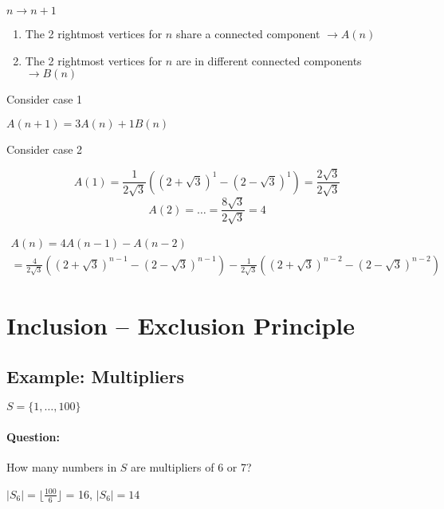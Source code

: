\documentclass[11pt]{article}
\begin{document}
$ n \rightarrow n + 1 $


\begin{enumerate}

\item
	The 2 rightmost vertices for $ n $ share a connected component $ \rightarrow A(n) $
	
\item
	The 2 rightmost vertices for $ n $ are in different connected components $ \rightarrow B(n) $

\end{enumerate}

Consider case 1

$ A(n + 1) = 3 A(n) + 1 B(n) $

Consider case 2




\[ A(1) = \frac{1}{2 \sqrt{3}} \left( ( 2 + \sqrt{3} )^1 - ( 2 - \sqrt{3} )^1 \right) = \frac{2 \sqrt{3}}{2 \sqrt{3}} \]
\[ A(2) = \dots = \frac{8 \sqrt{3}}{2 \sqrt{3}} = 4 \] \medskip

\begin{eqnarray}
A(n) = 4 A(n - 1) - A(n - 2) \\
= \frac{4}{2 \sqrt{3}} \left( ( 2 + \sqrt{3} )^{n-1} - ( 2 - \sqrt{3} )^{n-1} \right) - \frac{1}{2 \sqrt{3}} \left( ( 2 + \sqrt{3} )^{n-2} - ( 2 - \sqrt{3} )^{n-2} \right)
\end{eqnarray}


\section{Inclusion – Exclusion Principle}

\subsection{Example: Multipliers}

$ S = \{1, \dots, 100\} $

\paragraph{Question:} How many numbers in $ S $ are multipliers of 6 or 7? \newline

$ | S_6 | = \lfloor \frac{100}{6} \rfloor $ = 16, $ | S_6 | = 14 $ \newline
\end{document}
